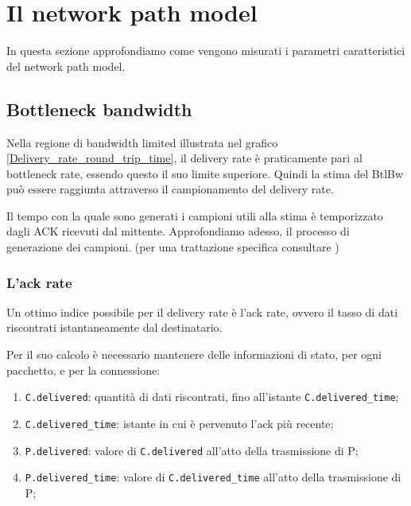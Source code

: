 \section{Il network path model}

In questa sezione approfondiamo come vengono misurati i parametri caratteristici del network path model.

\subsection{Bottleneck bandwidth} 

Nella regione di bandwidth limited illustrata nel grafico \ref{Delivery_rate_round_trip_time}, il delivery rate è praticamente pari al bottleneck rate, essendo questo il suo limite superiore. Quindi la stima del BtlBw può essere raggiunta attraverso il campionamento del delivery rate. \bigskip

Il tempo con la quale sono generati i campioni utili alla stima è temporizzato dagli ACK ricevuti dal mittente.
Approfondiamo adesso, il processo di generazione dei campioni. (per una trattazione specifica consultare \cite{ietf:draft-cheng-iccrg-delivery-rate-estimation-00}) \bigskip

\subsubsection{L'ack rate}

Un ottimo indice possibile per il delivery rate è l'ack rate, ovvero il tasso di dati riscontrati istantaneamente dal destinatario. \bigskip

Per il suo calcolo è necessario mantenere delle informazioni di stato, per ogni pacchetto, e per la connessione:

\begin{enumerate}

\item \texttt{C.delivered}: quantità di dati riscontrati, fino all’istante \texttt{C.delivered\_time};

\item \texttt{C.delivered\_time}: istante in cui è pervenuto l’ack più recente;

\item \texttt{P.delivered}: valore di \texttt{C.delivered} all’atto della trasmissione di P;

\item \texttt{P.delivered\_time}: valore di \texttt{C.delivered\_time} all’atto della trasmissione di P;

\end{enumerate}

